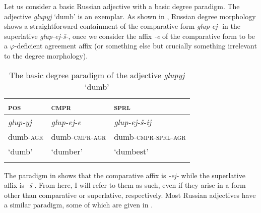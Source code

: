 \documentclass[output=paper,colorlinks,citecolor=brown]{langscibook}
\begin{document}
Let us consider a basic Russian adjective with a basic degree paradigm. The adjective \textit{glupyj} `dumb' is an exemplar. As shown in , Russian degree morphology shows a straightforward containment of the comparative form \textit{glup-ej-} in the superlative \textit{glup-ej-š-}, once we consider the affix \textit{-e} of the comparative form to be a $\varphi$-deficient agreement affix (or something else but crucially something irrelevant to the degree morphology).

\begin{table}
\caption{The basic degree paradigm of the adjective \textit{glupyj} `dumb'}
\label{kas:tab:glup:paradigm}
 \begin{tabularx}{.8\textwidth}{QQl}
  \lsptoprule
        \textsc{pos}   &\textsc{cmpr}  & \textsc{sprl} \\
  \midrule
        \textit{glup-yj} &\textit{glup-ej-e}  &\textit{glup-ej-š-ij} \\
        {dumb-\textsc{agr}} &{dumb-\textsc{cmpr-agr}}    &{dumb-\textsc{cmpr-sprl-agr}}  \\
        {`dumb'} & {`dumber'} & {`dumbest'}\\
  \lspbottomrule
 \end{tabularx}
\end{table}

The paradigm in  shows that the comparative affix is \textit{-ej-} while the superlative affix is \textit{-š-}. From here, I will refer to them as such, even if they arise in a form other than comparative or superlative, respectively. Most Russian adjectives have a similar paradigm, some of which are given in .
\end{document}
